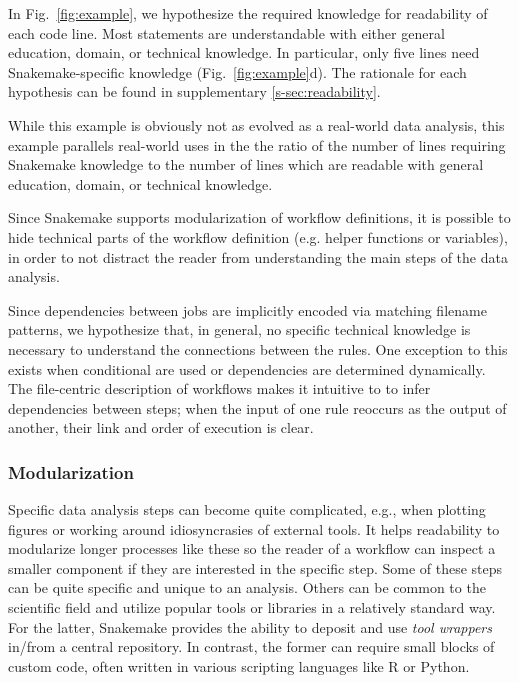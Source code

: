 \documentclass[parskip=half]{scrartcl}
\begin{document}
In Fig.~{\ref{fig:example}}, we hypothesize the required knowledge for readability of each code line.
Most statements are understandable with either general education, domain, or technical knowledge.
In particular, only five lines need Snakemake-specific knowledge (Fig.~{\ref{fig:example}}d).
The rationale for each hypothesis can be found in supplementary \autoref{s-sec:readability}.

While this example is obviously not as evolved as a real-world data analysis, this example parallels real-world uses in the the ratio of the number of lines requiring Snakemake knowledge to the number of lines which are readable with general education, domain, or technical knowledge.

Since Snakemake supports modularization of workflow definitions, it is possible to hide technical parts of the workflow definition (e.g. helper functions or variables), in order to not distract the reader from understanding the main steps of the data analysis.

Since dependencies between jobs are implicitly encoded via matching filename patterns, we hypothesize that, in general, no specific technical knowledge is necessary to understand the connections between the rules. One exception to this exists when conditional are used or dependencies are determined dynamically.
The file-centric description of workflows makes it intuitive to to infer dependencies between steps; when the input of one rule reoccurs as the output of another, their link and order of execution is clear.

\subsubsection{Modularization}\label{sec:modularization}

Specific data analysis steps can become quite complicated, e.g., when plotting figures or working around idiosyncrasies of external tools.
It helps readability to modularize longer processes like these so the reader of a workflow can inspect a smaller component if they are interested in the specific step.
Some of these steps can be quite specific and unique to an analysis.
Others can be common to the scientific field and utilize popular tools or libraries in a relatively standard way.
For the latter, Snakemake provides the ability to deposit and use \emph{tool wrappers} in/from a central repository.
In contrast, the former can require small blocks of custom code, often written in various scripting languages like R or Python.
\end{document}
